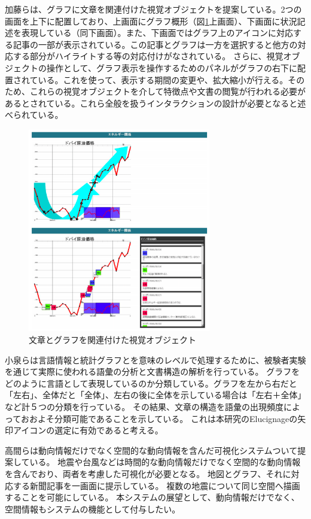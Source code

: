 \documentclass{matsushita-zemi}
\begin{document}
加藤らは、グラフに文章を関連付けた視覚オブジェクトを提案している\cite{InformationcompiledStudyGroup}。2つの画面を上下に配置しており、上画面にグラフ概形（図\ref{oblject}上画面）、下画面に状況記述を表現している（同下画面）。また、下画面ではグラフ上のアイコンに対応する記事の一部が表示されている。この記事とグラフは一方を選択すると他方の対応する部分がハイライトする等の対応付けがなされている。
さらに、視覚オブジェクトの操作として、グラフ表示を操作するためのパネルがグラフの右下に配置されている。これを使って、表示する期間の変更や、拡大縮小が行える。そのため、これらの視覚オブジェクトを介して特徴点や文書の閲覧が行われる必要があるとされている。これら全般を扱うインタラクションの設計が必要となると述べられている。
\begin{figure}[tb]
  \begin{center}
   \includegraphics[width=8cm,bb=0 0 507 566]{object.PNG}
  \end{center}
 \caption{文章とグラフを関連付けた視覚オブジェクト}
 \label{oblject}
\end{figure}

小泉らは言語情報と統計グラフとを意味のレベルで処理するために、被験者実験を通じて実際に使われる語彙の分析と文書構造の解析を行っている\cite{interconversion}。
グラフをどのように言語として表現しているのか分類している。グラフを左から右だと「左右」、全体だと「全体」、左右の後に全体を示している場合は「左右＋全体」など計５つの分類を行っている。
その結果、文章の構造を語彙の出現頻度によっておおよそ分類可能であることを示している。
これは本研究のElucignageの矢印アイコンの選定に有効であると考える。

高間らは動向情報だけでなく空間的な動向情報を含んだ可視化システムついて提案している\cite{SpaceTrendInformation}。
地震や台風などは時間的な動向情報だけでなく空間的な動向情報を含んでおり、両者を考慮した可視化が必要となる。
地図とグラフ、それに対応する新聞記事を一画面に提示している。
複数の地震について同じ空間へ描画することを可能にしている。
本システムの展望として、動向情報だけでなく、空間情報もシステムの機能として付与したい。
\end{document}
